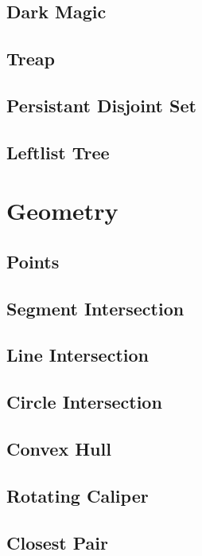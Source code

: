 \documentclass[a4paper,10pt,twocolumn,oneside]{article}
\begin{document}
\subsection{Dark Magic}

\subsection{Treap}

\subsection{Persistant Disjoint Set}

\subsection{Leftlist Tree}

\section{Geometry}
\subsection{Points}

\subsection{Segment Intersection}

\subsection{Line Intersection}

\subsection{Circle Intersection}

\subsection{Convex Hull}

\subsection{Rotating Caliper}

\subsection{Closest Pair}

\end{document}
